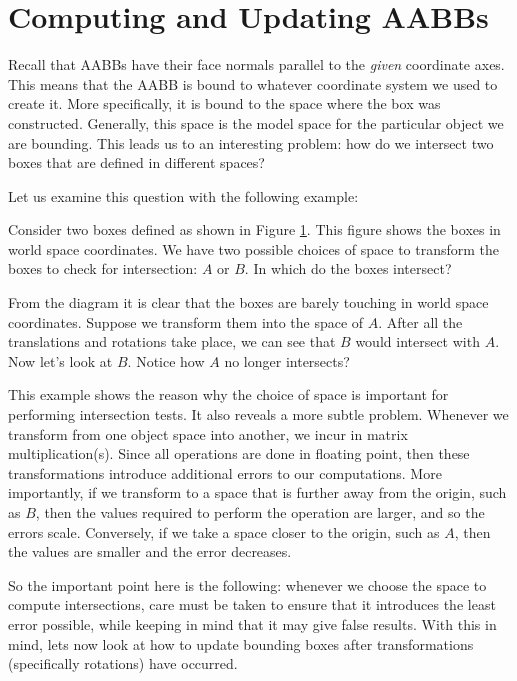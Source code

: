   \section{Computing and Updating AABBs}
    Recall that AABBs have their face normals parallel to the \emph{given}
    coordinate axes. This means that the AABB is bound to whatever coordinate
    system we used to create it. More specifically, it is bound to the space
    where the box was constructed.
    Generally, this space is the model space for the particular object we are
    bounding. This leads us to an interesting problem: how do we intersect two
    boxes that are defined in different spaces?

    Let us examine this question with the following example:
    \begin{exmp}
      Consider two boxes defined as shown in Figure \ref{}. This figure shows
      the boxes in world space coordinates. We have two possible choices of
      space to transform the boxes to check for intersection: $A$ or $B$. In
      which do the boxes intersect?
    \end{exmp}

    From the diagram it is clear that the boxes are barely touching in world
    space coordinates. Suppose we transform them into the space of $A$. After
    all the translations and rotations take place, we can see that $B$ would
    intersect with $A$. Now let's look at $B$. Notice how $A$ no longer
    intersects?

    This example shows the reason why the choice of space is important for
    performing intersection tests. It also reveals a more subtle problem.
    Whenever we transform from one object space into another, we incur in matrix
    multiplication(s). Since all operations are done in floating point, then
    these transformations introduce additional errors to our computations. More
    importantly, if we transform to a space that is further away from the
    origin, such as $B$, then the values required to perform the operation are
    larger, and so the errors scale. Conversely, if we take a space closer to
    the origin, such as $A$, then the values are smaller and the error
    decreases.

    So the important point here is the following: whenever we choose the space
    to compute intersections, care must be taken to ensure that it introduces
    the least error possible, while keeping in mind that it may give false
    results. With this in mind, lets now look at how to update bounding boxes
    after transformations (specifically rotations) have occurred.

